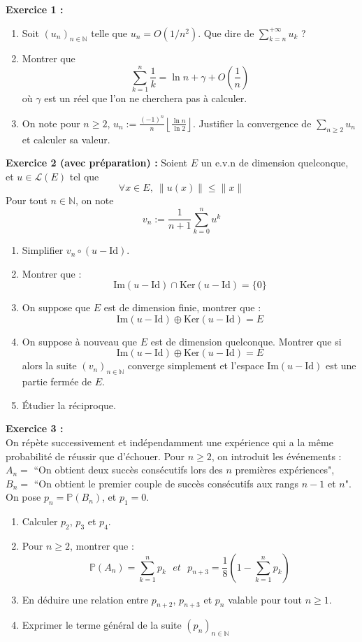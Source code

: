 \documentclass[11pt,a4paper]{article}
\begin{document}
\textbf{Exercice 1 :} 
\begin{enumerate}
\item Soit $(u_n)_{n \in \mathbb{N}}$ telle que $u_n = \displaystyle O(1/n^2)$. Que dire de $\displaystyle \sum_{k=n}^{+\infty} u_k$ ?
\item Montrer que \[\sum_{k=1}^n \frac{1}{k} = \ln{n} + \gamma + O(\frac{1}{n}) \] où $\gamma$ est un réel que l'on ne cherchera pas à calculer. \\
\item On note pour $n \geq 2$,  $u_n := \displaystyle \frac{(-1)^n}{n} \left \lfloor \frac{\ln{n}}{\ln{2}} \right \rfloor $. Justifier la convergence de $\displaystyle \sum_{n \geq 2} u_n$ et calculer sa valeur. \\
\end{enumerate} 


\textbf{Exercice 2 (avec préparation) :} Soient $E$ un e.v.n de dimension quelconque, et $u \in \mathcal{L}(E)$ tel que \[\forall x\in E, \ \| u(x) \| \leq \|x\| \]
Pour tout $n \in \mathbb{N}$, on note \[v_n := \frac{1}{n+1} \sum_{k=0}^n u^k\]
\begin{enumerate}
\item Simplifier $v_n \circ (u - \text{Id})$.
\item Montrer que :  \[\text{Im}(u-\text{Id}) \cap \text{Ker}(u-\text{Id}) = \{0\} \]
\item On suppose que $E$ est de dimension finie, montrer que : \[\text{Im}(u-\text{Id}) \oplus \text{Ker}(u-\text{Id}) = E \]
\item On suppose à nouveau que $E$ est de dimension quelconque. Montrer que si  \[\text{Im}(u-\text{Id}) \oplus \text{Ker}(u-\text{Id}) = E \] alors la suite $(v_n)_{n \in \mathbb{N}}$ converge simplement et l'espace $\text{Im}(u-\text{Id})$ est une partie fermée de $E$.
\item Étudier la réciproque. \\
\end{enumerate}


\textbf{Exercice 3 :} \\
On répète successivement et indépendamment une expérience qui a la même probabilité de réussir que d'échouer. Pour $n \geq 2$, on introduit les événements : \\
$A_n = $ ``On obtient deux succès consécutifs lors des $n$ premières expériences",\\
$B_n = $ ``On obtient le premier couple de succès consécutifs aux rangs $n - 1$ et $n$". \\
On pose $p_n = \mathbb{P}(B_n)$, et $p_1=0$.
\begin{enumerate}
\item Calculer $p_2$, $p_3$ et $p_4$.
\item Pour $n\geq 2$, montrer que : \[\mathbb{P}(A_n) = \sum_{k=1}^n p_k \ \ \ et \ \ \  p_{n+3} = \frac{1}{8}\left ( 1-\sum_{k=1}^n p_k \right ) \]
\item En déduire une relation entre $p_{n+2}$, $p_{n+3}$ et $p_n$ valable pour tout $n \geq 1$.
\item Exprimer le terme général de la suite $(p_n)_{n \in \mathbb{N}}$ \\
\end{enumerate}
\end{document}

